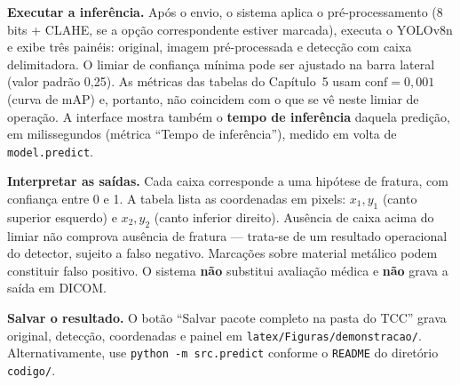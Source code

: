 \documentclass[12pt,oneside,a4paper,chapter=TITLE,section=TITLE,sumario=tradicional]{abntex2}
\begin{document}
\textbf{Executar a inferência.} Após o envio, o sistema aplica o pré-processamento (8 bits + CLAHE, se a opção correspondente estiver marcada), executa o YOLOv8n e exibe três painéis: original, imagem pré-processada e detecção com caixa delimitadora. O limiar de confiança mínima pode ser ajustado na barra lateral (valor padrão 0,25). As métricas das tabelas do Capítulo~5 usam $\mathrm{conf}=0{,}001$ (curva de mAP) e, portanto, não coincidem com o que se vê neste limiar de operação. A interface mostra também o \textbf{tempo de inferência} daquela predição, em milissegundos (métrica ``Tempo de inferência''), medido em volta de \texttt{model.predict}.

\textbf{Interpretar as saídas.} Cada caixa corresponde a uma hipótese de fratura, com confiança entre 0 e 1. A tabela lista as coordenadas em pixels: $x_1,y_1$ (canto superior esquerdo) e $x_2,y_2$ (canto inferior direito). Ausência de caixa acima do limiar não comprova ausência de fratura --- trata-se de um resultado operacional do detector, sujeito a falso negativo. Marcações sobre material metálico podem constituir falso positivo. O sistema \textbf{não} substitui avaliação médica e \textbf{não} grava a saída em DICOM.

\textbf{Salvar o resultado.} O botão ``Salvar pacote completo na pasta do TCC'' grava original, detecção, coordenadas e painel em \texttt{latex/Figuras/demonstracao/}. Alternativamente, use \texttt{python -m src.predict} conforme o \texttt{README} do diretório \texttt{codigo/}.
\end{document}
